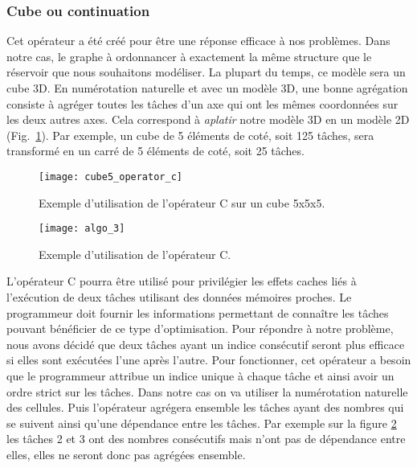 \subsubsection{Cube ou continuation}
Cet opérateur a été créé pour être une réponse efficace à nos problèmes.
%
Dans notre cas, le graphe à ordonnancer à exactement la même structure que le réservoir que nous souhaitons modéliser.
%
La plupart du temps, ce modèle sera un cube 3D.
%
En numérotation naturelle et avec un modèle 3D, une bonne agrégation consiste à agréger toutes les tâches d'un axe qui ont les mêmes coordonnées sur les deux autres axes.
%
Cela correspond à {\em aplatir} notre modèle 3D en un modèle 2D (Fig.~\ref{fig:cube5_algo_C}).
%
Par exemple, un cube de 5 éléments de coté, soit 125 tâches, sera transformé en un carré de 5 éléments de coté, soit 25 tâches.


\begin{figure}
  \centering
  \texttt{[image: cube5\_operator\_c]}
  \caption{Exemple d'utilisation de l'opérateur C sur un cube 5x5x5.}
  \label{fig:cube5_algo_C}
\end{figure}


\begin{figure}
  \centering
  \texttt{[image: algo\_3]}
  \caption{Exemple d'utilisation de l'opérateur C.}
  \label{fig:algo_C}
\end{figure}


L'opérateur C pourra être utilisé pour privilégier les effets caches liés à l'exécution de deux tâches utilisant des données mémoires proches.
%
Le programmeur doit fournir les informations permettant de connaître les tâches pouvant bénéficier de ce type d'optimisation.
%
Pour répondre à notre problème, nous avons décidé que deux tâches ayant un indice consécutif seront plus efficace si elles sont exécutées l'une après l'autre.
%
Pour fonctionner, cet opérateur a besoin que le programmeur attribue un indice unique à chaque tâche et ainsi avoir un ordre strict sur les tâches.
%
Dans notre cas on va utiliser la numérotation naturelle des cellules.
%
Puis l'opérateur agrégera ensemble les tâches ayant des nombres qui se suivent ainsi qu'une dépendance entre les tâches.
%
Par exemple sur la figure \ref{fig:algo_C} les tâches 2 et 3 ont des nombres consécutifs mais n'ont pas de dépendance entre elles, elles ne seront donc pas agrégées ensemble.



